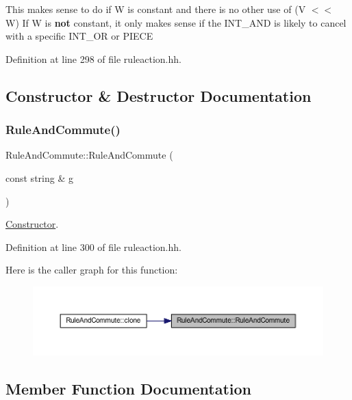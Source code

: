 This makes sense to do if W is constant and there is no other use of (V $<$$<$ W) If W is {\bfseries{not}} constant, it only makes sense if the I\+N\+T\+\_\+\+A\+ND is likely to cancel with a specific I\+N\+T\+\_\+\+OR or P\+I\+E\+CE 

Definition at line 298 of file ruleaction.\+hh.



\subsection{Constructor \& Destructor Documentation}
\mbox{\label{class_rule_and_commute_a038fb368ee512306b68265c7b8ac6868}} 
\subsubsection{\texorpdfstring{RuleAndCommute()}{RuleAndCommute()}}
{\footnotesize\ttfamily Rule\+And\+Commute\+::\+Rule\+And\+Commute (\begin{DoxyParamCaption}\item[{const string \&}]{g }\end{DoxyParamCaption})\hspace{0.3cm}{\ttfamily [inline]}}



\mbox{\hyperlink{class_constructor}{Constructor}}. 



Definition at line 300 of file ruleaction.\+hh.

Here is the caller graph for this function\+:
\nopagebreak
\begin{figure}[H]
\begin{center}
\leavevmode
\includegraphics[width=350pt]{class_rule_and_commute_a038fb368ee512306b68265c7b8ac6868_icgraph}
\end{center}
\end{figure}


\subsection{Member Function Documentation}
\mbox{\label{class_rule_and_commute_a4dd1bf0f7f55f84c7136a9fb4f44120f}} 
